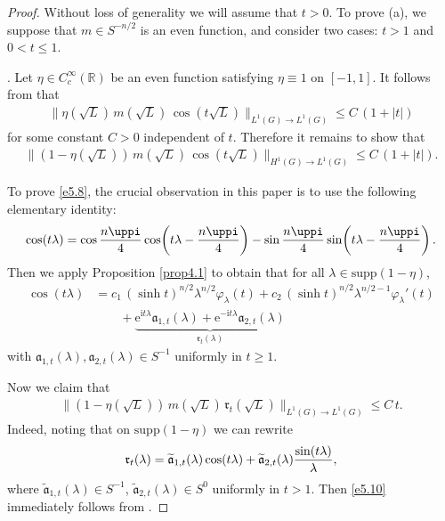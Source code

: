 \documentclass[a4paper,12pt]{amsart}
\numberwithin{equation}{section}
\theoremstyle{definition}
\theoremstyle{remark}
\numberwithin{theorem}{section}
\newcommand{\R}{\mathbb{R}}
\newcommand{\e}{\mathrm{e}}
\newcommand{\supp}{\mathrm{supp}}
\renewcommand{\i}{\mathrm{i}}
\begin{document}
\begin{proof}
Without loss of generality we will assume that $t>0$. To prove (a), we suppose that $m\in S^{-n/2}$ is an even function, 
and consider two cases: $t>1$ and $0<t\leq 1$. 
\medskip

.
Let $\eta\in C^\infty_c(\R)$ be an even function satisfying $\eta\equiv 1$ on $[-1,1]$. It follows from \cite[Theorem 8.1 (a)]{MuTh} that
\begin{align*}
\|\eta(\sqrt{L})\,m(\sqrt{L})\,\cos(t\sqrt{L})\|_{L^1(G)\to L^1(G)} \leq C\,( 1+|t|) 
\end{align*}
for some constant $C>0$ independent of $t$. Therefore it remains to show that
\begin{align}\label{e5.8}
\|(1-\eta(\sqrt{L}))\,m(\sqrt{L})\, \cos(t\sqrt{L})\|_{H^1(G)\to L^1(G)} \leq C\,( 1+|t|). 
\end{align}

To prove \eqref{e5.8}, the crucial observation in this paper is to use the following elementary identity:
\begin{align}
\cos(t\lambda)=\cos{n\uppi\over 4}\cos\!\left(t\lambda-{n\uppi\over 4}\right)-\sin{n\uppi\over 4}\sin\!\left(t\lambda-{n\uppi\over 4}\right).\label{e5.999}
\end{align}
Then we apply Proposition \ref{prop4.1} to obtain that for all $\lambda\in\supp(1-\eta)$,
\begin{align}
\cos(t\lambda) 
&=c_1\,(\sinh t)^{n/2}\lambda^{n/2}\varphi_\lambda(t) 
+c_2\,(\sinh t)^{n/2}\lambda^{n/2-1}\varphi_\lambda'(t) \nonumber\\ 
&\qquad+\underbrace{\e^{\i t\lambda}\mathfrak{a}_{1,t}(\lambda)+\e^{-\i t\lambda}\mathfrak{a}_{2,t}(\lambda)}_{\mathfrak{r}_t(\lambda)}\label{e5.9}
\end{align}
with $\mathfrak{a}_{1,t}(\lambda), \mathfrak{a}_{2,t}(\lambda)\in S^{-1}$ uniformly in $t\geq 1$.

Now we claim that
\begin{align}\label{e5.10}
\|(1-\eta(\sqrt{L}))\,m(\sqrt{L})\,\mathfrak{r}_t(\sqrt{L})\|_{L^1(G)\to L^1(G)}\leq C\, t.
\end{align}
Indeed, noting that on $\supp (1-\eta)$ we can rewrite
\begin{align*}
\mathfrak{r}_t(\lambda)=\widetilde{\mathfrak{a}}_{1,t}(\lambda)\cos(t\lambda)+\widetilde{\mathfrak{a}}_{2,t}(\lambda){\sin(t\lambda)\over \lambda},
\end{align*}
where $\widetilde{\mathfrak{a}}_{1,t}(\lambda)\in S^{-1}$, $ \widetilde{\mathfrak{a}}_{2,t}(\lambda)\in S^0$ uniformly in $t>1$. Then \eqref{e5.10} immediately follows from \cite[Theorem 8.1]{MuTh}.


\end{proof}
\end{document}
